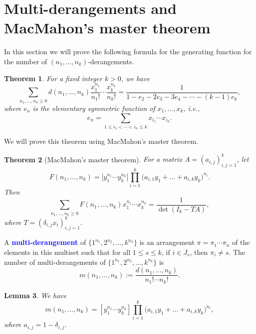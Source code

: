 \documentclass[oneside]{book}
\numberwithin{equation}{section}
\newtheorem{thm}{Theorem}[section]
\newtheorem{lem}[thm]{Lemma}
\theoremstyle{definition}
\renewcommand\emph[1]{\textcolor{blue}{\bf #1}}
\begin{document}
\section{Multi-derangements and MacMahon's master theorem}
\label{sec:enumeration}

In this section we will prove the following formula for the generating
function for the number of \( (n_1,\dots,n_k) \)-derangements.

\begin{thm}\label{thm:21}
For a fixed integer \( k>0 \), we have
  \[
    \sum_{n_1,\dots,n_k\geq0} d(n_1,\dots,n_k)
    \frac{x_1^{n_1}}{n_1!} \cdots \frac{x_k^{n_k}}{n_k!} =
    \frac{1}{1-e_2-2e_3-3e_4-\cdots-(k-1)e_k},
\]
where
$e_n$ is the elementary symmetric function of $x_1,\dots,x_k$, i.e.,
\[
e_n = \sum_{1\leq i_1<\cdots<i_n\leq k} x_{i_1}\cdots x_{i_n}.
\]
\end{thm}

We will prove this theorem using MacMahon's master theorem.

\begin{thm}[MacMahon's master theorem]
  \label{thm:MMT}
  For a matrix \( A = (a_{i,j})_{i,j=1}^k \), let
\[
  F(n_1,\dots,n_k)  =  \bigl[y_1^{n_1}\cdots y_k^{n_k}\bigr] 
\prod_{i=1}^k \bigl(a_{i,1}y_1 + \dots + a_{i,k}y_k \bigl)^{n_i}.
\]
Then
\[
  \sum _{n_{1},\dots ,n_{k}\ge 0}F(n_{1},\dots ,n_{k})x_{1}^{n_{1}}\cdots x_{k}^{n_{k}}
  ={\frac {1}{\det(I_{k}-TA)}},
\]
where \( T = (\delta_{i,j}x_i)_{i,j=1}^k \).
\end{thm}


A \emph{multi-derangement} of \(\{1^{n_1}, 2^{n_2},\dots,k^{n_k}\}\)
is an arrangement \( \pi=\pi_1 \cdots \pi_n \) of the elements in this
multiset such that for all \( 1\le s\le k \), if \( i\in J_s \), then
\( \pi_i\ne s \). The number of multi-derangements of
\(\{1^{n_1}, 2^{n_2},\dots,k^{n_k}\}\) is
\[
  m(n_1,\dots,n_k) := \frac{ d(n_1,\dots,n_k)}{n_1! \cdots n_k!}.
\]


\begin{lem}\label{lem:13}
  We have
  \[
      m(n_1,\dots,n_k)  = \left[y_1^{n_1}\cdots y_k^{n_k}\right] 
\prod_{i=1}^k \bigl(a_{i,1}y_1 + \dots + a_{i,k}y_k \bigl)^{n_i},
  \]
  where  \( a_{i,j}=1-\delta_{i,j} \). 
\end{lem}
\end{document}
